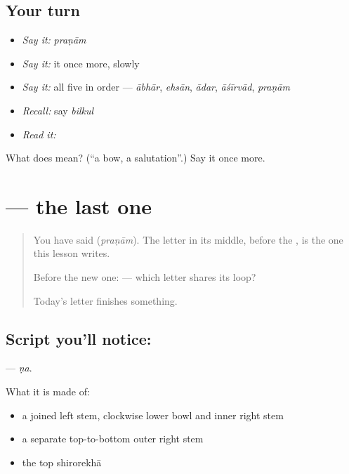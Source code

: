 \subsection*{Your turn}
\begin{itemize}
\raggedright
  \item \emph{Say it:} \emph{praṇām}
  \item \emph{Say it:} it once more, slowly
  \item \emph{Say it:} all five in order — \emph{ābhār}, \emph{ehsān}, \emph{ādar}, \emph{āśīrvād}, \emph{praṇām}
  \item \emph{Recall:} say \emph{bilkul}
  \item \emph{Read it:} \textbf{}
\end{itemize}

\begin{tcolorbox}[breakable,colback=teal!4,colframe=teal!35!black,title={Before you move on}]
What does  mean? (\textquotedblleft{}a bow, a salutation\textquotedblright{}.) Say it once more.
\end{tcolorbox}
\section[\texorpdfstring{\hi{ण} (ṇa)}{ण (ṇa)}]{ — the last one}

\label{lesson:HI-S147-letter-na-retroflex}



\begin{quote}
You have said \textbf{} (\emph{praṇām}). The letter in its middle, before the \textbf{}, is the one this lesson writes.

Before the new one: \textbf{} — which letter shares its loop?

Today's letter finishes something.
\end{quote}

\subsection*{Script you'll notice: }
\textbf{} — \emph{ṇa}.

What it is made of:

\begin{itemize}
\raggedright
  \item a joined left stem, clockwise lower bowl and inner right stem
  \item a separate top-to-bottom outer right stem
  \item the top shirorekhā
\end{itemize}

